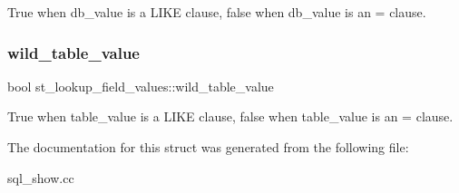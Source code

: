True when {\ttfamily db\+\_\+value} is a L\+I\+KE clause, false when {\ttfamily db\+\_\+value} is an \textquotesingle{}=\textquotesingle{} clause. \mbox{\label{structst__lookup__field__values_afc672c52a3286578c0edaee5676cf7fb}} 
\subsubsection{\texorpdfstring{wild\+\_\+table\+\_\+value}{wild\_table\_value}}
{\footnotesize\ttfamily bool st\+\_\+lookup\+\_\+field\+\_\+values\+::wild\+\_\+table\+\_\+value}

True when {\ttfamily table\+\_\+value} is a L\+I\+KE clause, false when {\ttfamily table\+\_\+value} is an \textquotesingle{}=\textquotesingle{} clause. 

The documentation for this struct was generated from the following file\+:\begin{DoxyCompactItemize}
\item 
sql\+\_\+show.\+cc\end{DoxyCompactItemize}
